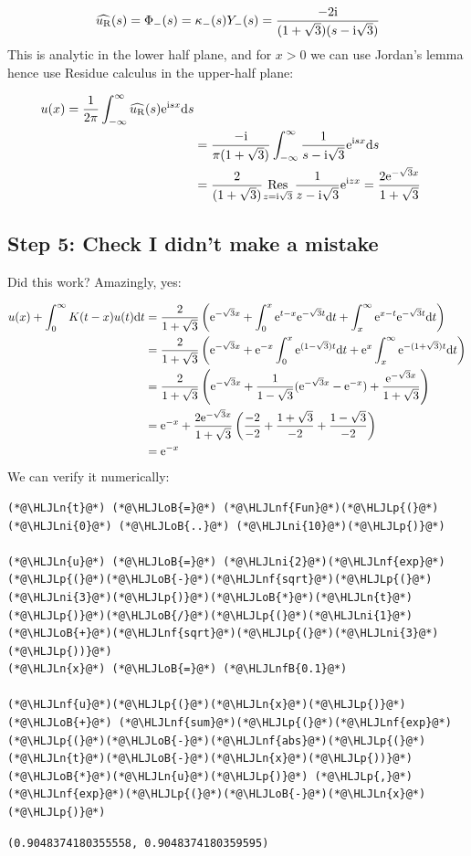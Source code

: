 \documentclass[12pt,a4paper]{article}
\newcommand{\HLJLn}[1]{#1}
\newcommand{\HLJLnf}[1]{\textcolor[RGB]{66,102,213}{#1}}
\newcommand{\HLJLnfB}[1]{\textcolor[RGB]{59,151,46}{#1}}
\newcommand{\HLJLni}[1]{\textcolor[RGB]{59,151,46}{#1}}
\newcommand{\HLJLoB}[1]{\textcolor[RGB]{102,102,102}{\textbf{#1}}}
\newcommand{\HLJLp}[1]{#1}
\def\D{ {\rm d} }
\def\I{ {\rm i} }
\def\E{ {\rm e} }
\def\Res_#1{\underset{#1}{\rm Res}\,}
\def\addtab#1={#1\;&=}
\def\ccr{\\\addtab}
\def\dt{\D t}
\def\ds{\D s}
\def\addtab#1={#1\;&=}
\def\ccr{\\\addtab}
\begin{document}
\[
\widehat{u_{\rm R}}(s) = \Phi_-(s) = \kappa_-(s) Y_-(s) =  {-2 \I \over (1+\sqrt{3})(s-\I \sqrt 3)}
\]
This is analytic in the lower half plane, and for $x > 0$ we can use Jordan's lemma hence use  Residue calculus in the upper-half plane:


\begin{align*}
u(x) = {1 \over 2 \pi} \int_{-\infty}^\infty \widehat{u_{\rm R}}(s) \E^{\I s x} \ds  \ccr
= {-\I \over \pi(1+\sqrt{3})} \int_{-\infty}^\infty {1 \over s-\I \sqrt 3} \E^{\I s x} \ds  \ccr
= {2   \over (1+\sqrt{3})} \Res_{z=\I \sqrt 3} {1 \over z-\I \sqrt 3} \E^{\I z x}  = 
{2 \E^{-\sqrt{3}x}    \over 1+\sqrt{3}} 
\end{align*}
\subsection{Step 5: Check I didn't make a mistake}
Did this work? Amazingly, yes:


\begin{align*}
u(x) + \int_0^\infty K(t -x) u(t) \dt &= {2   \over 1+\sqrt{3}} \left(  \E^{-\sqrt{3}x}  +   \int_0^x \E^{t-x} \E^{-\sqrt{3}t} \dt +  \int_x^\infty \E^{x-t} \E^{-\sqrt{3}t}\dt \right) \\
&={2    \over 1+\sqrt{3}}\left( \E^{-\sqrt{3}x}   +  \E^{-x}    \int_0^x \E^{(1-\sqrt{3})t} \dt + \E^x  \int_x^\infty  \E^{-(1+\sqrt{3})t}\dt \right) \\
&={2     \over 1+\sqrt{3}}\left( \E^{-\sqrt{3}x}  + {1  \over 1-\sqrt 3}   (\E^{-\sqrt{3}x} - \E^{-x}) + { \E^{-\sqrt 3 x } \over 1+\sqrt{3}} \right) \\
&=\E^{-x} + {2  \E^{-\sqrt{3}x}   \over 1+\sqrt{3}}\left({-2 \over -2}   + {1+ \sqrt 3  \over -2} + {1 - \sqrt 3 \over -2} \right)  \\
&= \E^{-x}
\end{align*}
We can verify it numerically:


\begin{lstlisting}
(*@\HLJLn{t}@*) (*@\HLJLoB{=}@*) (*@\HLJLnf{Fun}@*)(*@\HLJLp{(}@*)(*@\HLJLni{0}@*) (*@\HLJLoB{..}@*) (*@\HLJLni{10}@*)(*@\HLJLp{)}@*)

(*@\HLJLn{u}@*) (*@\HLJLoB{=}@*) (*@\HLJLni{2}@*)(*@\HLJLnf{exp}@*)(*@\HLJLp{(}@*)(*@\HLJLoB{-}@*)(*@\HLJLnf{sqrt}@*)(*@\HLJLp{(}@*)(*@\HLJLni{3}@*)(*@\HLJLp{)}@*)(*@\HLJLoB{*}@*)(*@\HLJLn{t}@*)(*@\HLJLp{)}@*)(*@\HLJLoB{/}@*)(*@\HLJLp{(}@*)(*@\HLJLni{1}@*)(*@\HLJLoB{+}@*)(*@\HLJLnf{sqrt}@*)(*@\HLJLp{(}@*)(*@\HLJLni{3}@*)(*@\HLJLp{))}@*)
(*@\HLJLn{x}@*) (*@\HLJLoB{=}@*) (*@\HLJLnfB{0.1}@*)

(*@\HLJLnf{u}@*)(*@\HLJLp{(}@*)(*@\HLJLn{x}@*)(*@\HLJLp{)}@*) (*@\HLJLoB{+}@*) (*@\HLJLnf{sum}@*)(*@\HLJLp{(}@*)(*@\HLJLnf{exp}@*)(*@\HLJLp{(}@*)(*@\HLJLoB{-}@*)(*@\HLJLnf{abs}@*)(*@\HLJLp{(}@*)(*@\HLJLn{t}@*)(*@\HLJLoB{-}@*)(*@\HLJLn{x}@*)(*@\HLJLp{))}@*)(*@\HLJLoB{*}@*)(*@\HLJLn{u}@*)(*@\HLJLp{)}@*) (*@\HLJLp{,}@*) (*@\HLJLnf{exp}@*)(*@\HLJLp{(}@*)(*@\HLJLoB{-}@*)(*@\HLJLn{x}@*)(*@\HLJLp{)}@*)
\end{lstlisting}

\begin{lstlisting}
(0.9048374180355558, 0.9048374180359595)
\end{lstlisting}
\end{document}
